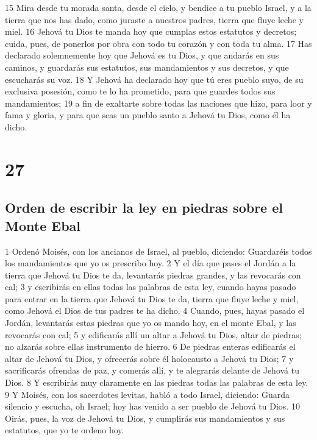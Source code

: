 15 Mira desde tu morada santa, desde el cielo, y bendice a tu pueblo Israel, y a la tierra que nos has dado, como juraste a nuestros padres, tierra que fluye leche y miel.
16 Jehová tu Dios te manda hoy que cumplas estos estatutos y decretos; cuida, pues, de ponerlos por obra con todo tu corazón y con toda tu alma.
17 Has declarado solemnemente hoy que Jehová es tu Dios, y que andarás en sus caminos, y guardarás sus estatutos, sus mandamientos y sus decretos, y que escucharás su voz.
18 Y Jehová ha declarado hoy que tú eres pueblo suyo, de su exclusiva posesión, como te lo ha prometido, para que guardes todos sus mandamientos;
19 a fin de exaltarte sobre todas las naciones que hizo, para loor y fama y gloria, y para que seas un pueblo santo a Jehová tu Dios, como él ha dicho.

\chapter{27}



\section{Orden de escribir la ley en piedras sobre el Monte Ebal}


1 Ordenó Moisés, con los ancianos de Israel, al pueblo, diciendo: Guardaréis todos los mandamientos que yo os prescribo hoy.
2 Y el día que pases el Jordán a la tierra que Jehová tu Dios te da, levantarás piedras grandes, y las revocarás con cal; 
3 y escribirás en ellas todas las palabras de esta ley, cuando hayas pasado para entrar en la tierra que Jehová tu Dios te da, tierra que fluye leche y miel, como Jehová el Dios de tus padres te ha dicho.
4 Cuando, pues, hayas pasado el Jordán, levantarás estas piedras que yo os mando hoy, en el monte Ebal, y las revocarás con cal;
5 y edificarás allí un altar a Jehová tu Dios, altar de piedras; no alzarás sobre ellas instrumento de hierro.
6 De piedras enteras edificarás el altar de Jehová tu Dios, y ofrecerás sobre él holocausto a Jehová tu Dios;
7 y sacrificarás ofrendas de paz, y comerás allí, y te alegrarás delante de Jehová tu Dios.
8 Y escribirás muy claramente en las piedras todas las palabras de esta ley.
9 Y Moisés, con los sacerdotes levitas, habló a todo Israel, diciendo: Guarda silencio y escucha, oh Israel; hoy has venido a ser pueblo de Jehová tu Dios.
10 Oirás, pues, la voz de Jehová tu Dios, y cumplirás sus mandamientos y sus estatutos, que yo te ordeno hoy.

